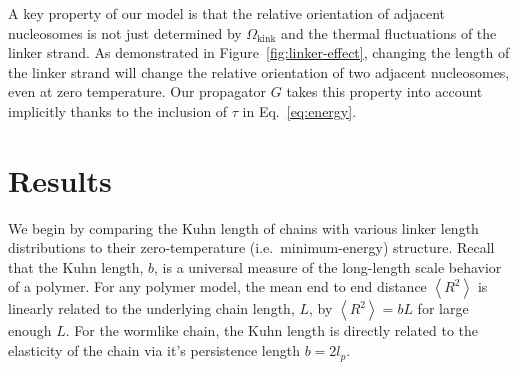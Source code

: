 \documentclass[%
 reprint,
superscriptaddress,
showpacs,preprintnumbers,
 amsmath,amssymb,
 aps,
 prl,
]{revtex4-1}
\newcommand{\RR}{\left\langle{}R^2\right\rangle{}}
\begin{document}
A key property of our model is that the relative orientation of adjacent
    nucleosomes is not just determined by $\Omega_\text{kink}$ and the thermal
    fluctuations of the linker strand.
As demonstrated in Figure~\ref{fig:linker-effect}, changing the length of the
    linker strand will change the relative orientation of two adjacent
    nucleosomes, even at zero temperature.
Our propagator $G$ takes this property into account implicitly thanks to the
    inclusion of $\tau$ in Eq.~\ref{eq:energy}.



\section{\label{sec:results}Results}
We begin by comparing the Kuhn length of chains with various linker length
    distributions to their zero-temperature (i.e.\ minimum-energy) structure.
Recall that the Kuhn length, $b$, is a universal measure of the long-length
    scale behavior of a polymer.
For any polymer model, the mean end to end distance $\RR$ is linearly related to the
    underlying chain length, $L$, by $\RR = bL$ for large enough $L$.
For the wormlike chain, the Kuhn length is directly related to the elasticity of
    the chain via it's persistence length $b = 2l_p$.
\end{document}
